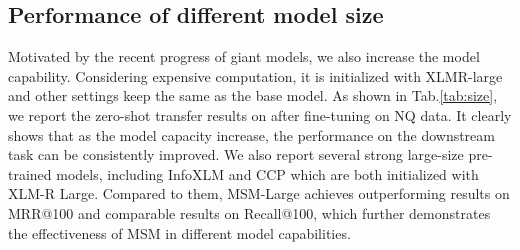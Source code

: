 \begin{table}[!ht]
    \caption{Comparison with existing approaches. For the training objective, BI means bi-lingual pair alignment task, and CROP means contrastive learning with cropped spans. For the corpora, CC means CommonCrawl, mWiki means multi-lingual data from Wikipedia, and Bi-lingual may include MultiUN, OPUS, WikiMatrix, etc~\citep{chi-etal-2021-infoxlm}, which depends on models.}
    \centering
\label{app:comparison}
\end{table}



\subsection{Performance of different model size }
\label{ap:size}

Motivated by the recent progress of giant models, we also increase the model capability. Considering expensive computation, it is initialized with XLMR-large and other settings keep the same as the base model. As shown in Tab.\ref{tab:size}, we report the zero-shot transfer results on \tydi after fine-tuning on NQ data. It clearly shows that as the model capacity increase, the performance on the downstream task can be consistently improved. We also report several strong large-size pre-trained models, including InfoXLM and CCP which are both initialized with XLM-R Large. Compared to them, MSM-Large achieves outperforming results on MRR@100 and comparable results on Recall@100, which further demonstrates the effectiveness of MSM in different model capabilities.



